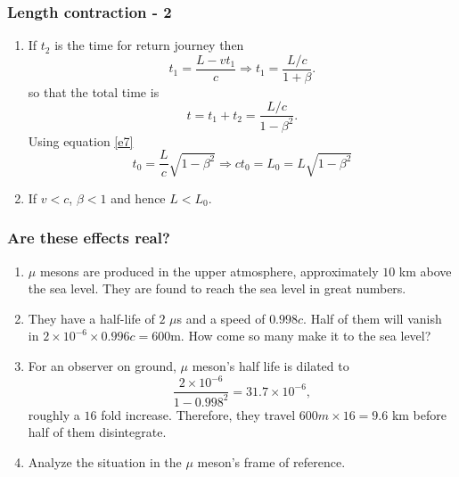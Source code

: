 \documentclass{beamer}
\begin{document}
\begin{frame}
\frametitle{Length contraction - 2}
\begin{enumerate}
\item If $t_2$ is the time for return journey then
\begin{equation}\label{e10}
t_1 = \frac{L - vt_1}{c} \Rightarrow t_1 = \frac{L/c}{1 + \beta}.
\end{equation}
so that the total time is
\begin{equation}\label{e11}
t = t_1 + t_2 = \frac{L/c}{1 - \beta^2}.
\end{equation}
Using equation \eqref{e7}
\begin{equation}\label{e12}
t_0 = \frac{L}{c}\sqrt{1 - \beta^2} \Rightarrow ct_0 = L_0 = L\sqrt{1 - \beta^2}
\end{equation}
\item If $v < c$, $\beta < 1$ and hence $L < L_0$.
\end{enumerate}
\end{frame}

\begin{frame}
\frametitle{Are these effects real?}
\begin{enumerate}
\item $\mu$ mesons are produced in the upper atmosphere, approximately $10$ km
above the sea level. They are found to reach the sea level in great numbers.
\item They have a half-life of $2$ $\mu$s and a speed of $0.998c$. Half of them
will vanish in $2 \times 10^{-6} \times 0.996c = 600$m. How come so many make it
to the sea level? 
\item For an observer on ground, $\mu$ meson's half life is dilated to 
\[
\frac{2 \times 10^{-6}}{1 - 0.998^2} = 31.7 \times 10^{-6},
\]
roughly a $16$ fold increase. Therefore, they travel $600m \times 16 = 9.6$ km
before half of them disintegrate.
\item Analyze the situation in the $\mu$ meson's frame of reference.
\end{enumerate}
\end{frame}
\end{document}
